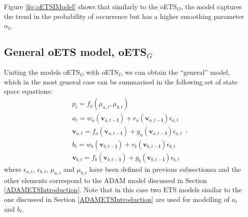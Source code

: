 \documentclass[
]{book}
\theoremstyle{definition}
\theoremstyle{definition}
\theoremstyle{definition}
\theoremstyle{definition}
\theoremstyle{remark}
\begin{document}
Figure \ref{fig:oETSIModel} shows that similarly to the oETS\(_O\), the model captures the trend in the probability of occurrence but has a higher smoothing parameter \(\alpha_b\).

\hypertarget{oETSG}{%
\subsection{\texorpdfstring{General oETS model, oETS\(_G\)}{General oETS model, oETS\_G}}\label{oETSG}}

Uniting the models oETS\(_O\) with oETS\(_I\), we can obtain the ``general'' model, which in the most general case can be summarised in the following set of state space equations:
\begin{equation}
    \begin{aligned}
        & p_t = f_p(\mu_{a,t}, \mu_{b,t}) \\
        & a_t = w_a(\mathbf{v}_{a,t-\mathbf{l}}) + r_a(\mathbf{v}_{a,t-\mathbf{l}}) \epsilon_{a,t} \\
        & \mathbf{v}_{a,t} = f_a(\mathbf{v}_{a,t-\mathbf{l}}) + g_a(\mathbf{v}_{a,t-\mathbf{l}}) \epsilon_{a,t} \\
        & b_t = w_b(\mathbf{v}_{b,t-\mathbf{l}}) + r_b(\mathbf{v}_{b,t-\mathbf{l}}) \epsilon_{b,t} \\
        & \mathbf{v}_{b,t} = f_b(\mathbf{v}_{b,t-\mathbf{l}}) + g_b(\mathbf{v}_{b,t-\mathbf{l}}) \epsilon_{b,t}
    \end{aligned} ,
  \label{eq:oETSG}
\end{equation}
where \(\epsilon_{a,t}\), \(\epsilon_{b,t}\), \(\mu_{a,t}\) and \(\mu_{b,t}\) have been defined in previous subsectionsa and the other elements correspond to the ADAM model discussed in Section \ref{ADAMETSIntroduction}. Note that in this case two ETS models similar to the one discussed in Section \ref{ADAMETSIntroduction} are used for modelling of \(a_t\) and \(b_t\).
\end{document}
